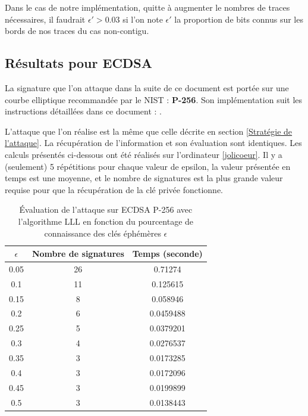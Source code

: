 \documentclass{backend}
\begin{document}
Dans le cas de notre implémentation, quitte à augmenter le nombres de traces nécessaires, il faudrait $\epsilon' > 0.03$ si l'on note $\epsilon'$ la proportion de bits connus sur les bords de nos traces du cas non-contigu.




\subsection{Résultats pour ECDSA}


La signature que l'on attaque dans la suite de ce document est portée sur une courbe elliptique recommandée par le NIST : \textbf{P-256}. Son implémentation suit les instructions détaillées dans ce document : \cite{NIST_ECDSA}.

\smallbreak

L'attaque que l'on réalise est la même que celle décrite en section \ref{Stratégie de l'attaque}. La récupération de l'information et son évaluation sont identiques. Les calculs présentés ci-dessous ont été réalisés sur l'ordinateur \ref{jolicoeur}. Il y a (seulement) 5 répétitions pour chaque valeur de epsilon, la valeur présentée en temps est une moyenne, et le nombre de signatures est la plus grande valeur requise pour que la récupération de la clé privée fonctionne.


\begin{center}
    \begin{table}[ht]
        \centering
        \caption{Évaluation de l'attaque sur ECDSA P-256 avec l'algorithme LLL en fonction du pourcentage de connaissance des clés éphémères $\epsilon$ }
        \label{tab:attaque_ECDSA}
        
        \begin{tabular}{|c|c|c|}
            \toprule
            $\epsilon$ & Nombre de signatures & Temps (seconde) \\
            \midrule
            0.05 &                   26 &         0.71274    \\
            0.1  &                   11 &         0.125615   \\
            0.15 &                    8 &         0.058946   \\
            0.2  &                    6 &         0.0459488  \\
            0.25 &                    5 &         0.0379201  \\
            0.3  &                    4 &         0.0276537  \\
            0.35 &                    3 &         0.0173285  \\
            0.4  &                    3 &         0.0172096  \\
            0.45 &                    3 &         0.0199899  \\
            0.5  &                    3 &         0.0138443  \\
            \bottomrule
        \end{tabular}
    \end{table}
\end{center}
\end{document}
